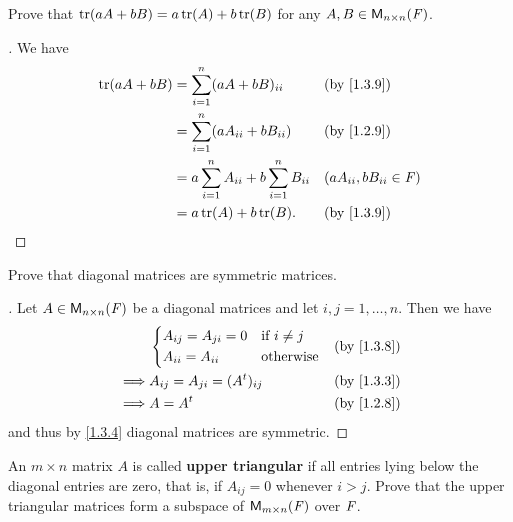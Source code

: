 \begin{ex}\label{ex:1.3.6}
	Prove that \(\tr[aA + bB] = a\tr[A] + b\tr[B]\) for any \(A, B \in \ms[n][n][\F]\).
\end{ex}

\begin{proof}[]
	We have
	\begin{align*}
		\tr[aA + bB] & = \sum_{i = 1}^n (aA + bB)_{i i}                      &  & \by{1.3.9}                  \\
		             & = \sum_{i = 1}^n (aA_{i i} + bB_{i i})                &  & \by{1.2.9}                  \\
		             & = a \sum_{i = 1}^n A_{i i} + b \sum_{i = 1}^n B_{i i} &  & (aA_{i i}, bB_{i i} \in \F) \\
		             & = a\tr[A] + b\tr[B].                                  &  & \by{1.3.9}
	\end{align*}
\end{proof}

\begin{ex}\label{ex:1.3.7}
	Prove that diagonal matrices are symmetric matrices.
\end{ex}

\begin{proof}[]
	Let \(A \in \ms[n][n][\F]\) be a diagonal matrices and let \(i, j = 1, \dots, n\).
	Then we have
	\begin{align*}
		         & \begin{dcases}
			           A_{i j} = A_{j i} = 0 & \text{if } i \neq j \\
			           A_{i i} = A_{i i}     & \text{otherwise}
		           \end{dcases} &  & \by{1.3.8}                    \\
		\implies & A_{i j} = A_{j i} = (\tp{A})_{i j}             &  & \by{1.3.3} \\
		\implies & A = \tp{A}                                     &  & \by{1.2.8}
	\end{align*}
	and thus by \cref{1.3.4} diagonal matrices are symmetric.
\end{proof}

\setcounter{ex}{11}
\begin{ex}\label{ex:1.3.12}
	An \(m \times n\) matrix \(A\) is called \textbf{upper triangular} if all entries lying below the diagonal entries are zero, that is, if \(A_{i j} = 0\) whenever \(i > j\).
	Prove that the upper triangular matrices form a subspace of \(\MS\) over \(\mathit{F}\).
\end{ex}

